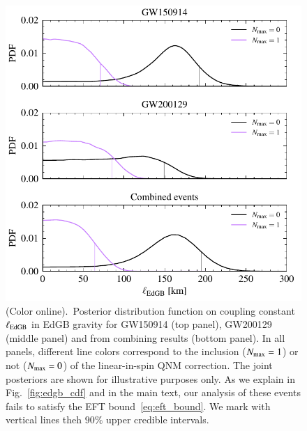 \documentclass[twocolumn,
               prd,
               aps,
               superscriptaddress,
               tightenlines,
               nofootinbib,
               eqsecnum,
               amsfonts,
               amsmath,
               longbibliography]{revtex4-1}
\begin{document}
\begin{figure}[t]
\includegraphics[width=\columnwidth]{figs/edgb_posteriors_combined.pdf}
\caption{(Color online).~Posterior distribution function on coupling constant $\ell_{\rm EdGB}$ in EdGB gravity
for GW150914 (top panel), GW200129 (middle panel)
and from combining results (bottom panel).
%
In all panels, different line colors correspond to the inclusion ($N_{\rm max} = 1$) or not ($N_{\rm max} = 0$)
of the linear-in-spin QNM correction.
%
The joint posteriors are shown for illustrative purposes only. As we explain in Fig.~\ref{fig:edgb_cdf} and
in the main text, our analysis of these events fails to satisfy the EFT bound~\eqref{eq:eft_bound}. We mark
with vertical lines theh $90\%$ upper credible intervals.}
\label{fig:edgb_exec_sum}
\end{figure}
\end{document}
